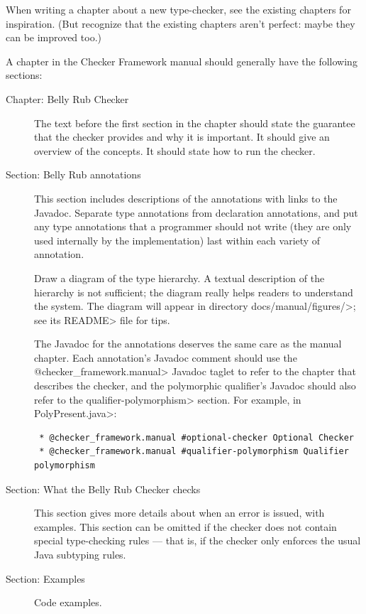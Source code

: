 When writing a chapter about a new type-checker, see the existing chapters
for inspiration.  (But recognize that the existing chapters aren't perfect:
maybe they can be improved too.)

A chapter in the Checker Framework manual should generally have the
following sections:

\begin{description}

\item[Chapter: Belly Rub Checker]
  The text before the first section in the chapter should state the
  guarantee that the checker provides and why it is important.  It should
  give an overview of the concepts.  It should state how to run the checker.

\item[Section: Belly Rub annotations]
  This section includes descriptions of the annotations with links to the
  Javadoc.  Separate type annotations from declaration annotations, and put
  any type annotations that a programmer should not write (they are only used
  internally by the implementation) last within each variety of annotation.

  Draw a diagram of the type hierarchy.  A textual description of
  the hierarchy is not sufficient; the diagram really helps readers to
  understand the system.
  The diagram will appear in directory \<docs/manual/figures/>;
  see its \<README> file for tips.

  The Javadoc for the annotations deserves the same care as the manual
  chapter.  Each annotation's Javadoc comment should use the
  \<@checker\_framework.manual> Javadoc taglet to refer to the chapter that
  describes the checker, and the polymorphic qualifier's Javadoc should
  also refer to the \<qualifier-polymorphism> section.  For example, in
  \<PolyPresent.java>:

  \begin{Verbatim}
 * @checker_framework.manual #optional-checker Optional Checker
 * @checker_framework.manual #qualifier-polymorphism Qualifier polymorphism
  \end{Verbatim}

\item[Section: What the Belly Rub Checker checks]
  This section gives more details about when an error is issued, with examples.
  This section can be omitted if the checker does not contain special
  type-checking rules --- that is, if the checker only enforces the usual
  Java subtyping rules.

\item[Section: Examples]
  Code examples.
\end{description}

